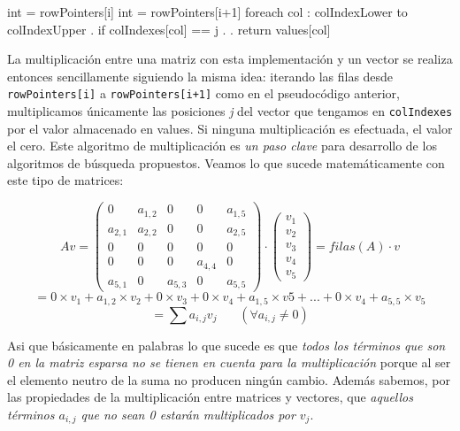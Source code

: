 	\vspace{\baselineskip}
	\begin{codebox}
	\li int  = rowPointers[i]
	\li int  = rowPointers[i+1]
	\li foreach col : colIndexLower to colIndexUpper
	\li .	if  colIndexes[col] == j
	\li .	.	return values[col]
	\End
	\end{codebox} 
	\vspace{\baselineskip}
	
	La multiplicación entre una matriz con esta implementación y un vector se realiza entonces sencillamente siguiendo la misma idea: iterando las filas desde \texttt{rowPointers[i]} a \texttt{rowPointers[i+1]} como en el pseudocódigo anterior, multiplicamos únicamente las posiciones \textit{j} del vector que tengamos en \texttt{colIndexes} por el valor almacenado en values. Si ninguna multiplicación es efectuada, el valor el cero. Este algoritmo de multiplicación es \textit{un paso clave} para desarrollo de los algoritmos de búsqueda propuestos. Veamos lo que sucede matemáticamente con este tipo de matrices: 

\vspace{\baselineskip}

\[	Av =
	 \begin{pmatrix}
	 0 & a_{1,2} & 0 & 0 & a_{1,5} \\
	 a_{2,1} & a_{2,2} & 0 & 0 & a_{2,5} \\
	 0 & 0 & 0 & 0 & 0 \\
	 0 & 0 & 0 & a_{4,4} & 0 \\
	 a_{5,1} & 0 & a_{5,3} & 0 & a_{5,5}
	 \end{pmatrix}
	 \cdot
	 \begin{pmatrix}
	 v_1 \\
	 v_2 \\
	 v_3 \\
	 v_4 \\
	 v_5 
	 \end{pmatrix}
	  = filas(A) \cdot v
\]
\vspace{2 pt}
\[
	= 0 \times v_1 + a_{1,2} \times v_2 + 0 \times v_3 + 0 \times v_4 + a_{1,5} \times v5 + ... + 0 \times v_4 + a_{5,5} \times v_5
\]
\vspace{2 pt}
\[
    = \sum a_{i,j} v_j  \ \ \ \ \ \ \ \ (\forall a_{i,j} \neq 0)
\]
\vspace{5 pt}

\par
Asi que básicamente en palabras lo que sucede es que \textit{todos los términos que son 0 en la matriz esparsa no se tienen en cuenta para la multiplicación} porque al ser el elemento neutro de la suma no producen ningún cambio. Además sabemos, por las propiedades de la multiplicación entre matrices y vectores, que \textit{aquellos términos $a_{i,j}$ que no sean 0 estarán multiplicados por $v_j$}. 

